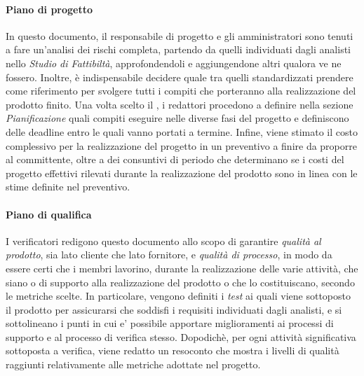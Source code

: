 		\paragraph{Piano di progetto}
			In questo documento, il responsabile di progetto e gli amministratori sono tenuti a fare un'analisi dei rischi completa, partendo da quelli individuati dagli analisti nello \textit{Studio di Fattibiltà}, approfondendoli e aggiungendone altri qualora ve ne fossero. Inoltre, è indispensabile decidere quale  tra quelli standardizzati prendere come riferimento per svolgere tutti i compiti che porteranno alla realizzazione del prodotto finito. Una volta scelto il , i redattori procedono a definire nella sezione \textit{Pianificazione} quali compiti eseguire nelle diverse fasi del progetto e definiscono delle deadline entro le quali vanno portati a termine. Infine, viene stimato il costo complessivo per la realizzazione del progetto in un preventivo a finire da proporre al committente, oltre a dei consuntivi di periodo che determinano se i costi del progetto effettivi rilevati durante la realizzazione del prodotto sono in linea con le stime definite nel preventivo.
		\paragraph{Piano di qualifica}
 			I verificatori redigono questo documento allo scopo di garantire \textit{qualità al prodotto}, sia lato cliente che lato fornitore, e \textit{qualità di processo}, in modo da essere certi che i membri lavorino, durante la realizzazione delle varie attività, che siano o di supporto alla realizzazione del prodotto o che lo costituiscano, secondo le metriche scelte. In particolare, vengono definiti i \textit{test} ai quali viene sottoposto il prodotto per assicurarsi che soddisfi i requisiti individuati dagli analisti, e si sottolineano i punti in cui e' possibile apportare miglioramenti ai processi di supporto e al processo di verifica stesso. Dopodichè, per ogni attività significativa sottoposta a verifica, viene redatto un resoconto che mostra i livelli di qualità raggiunti relativamente alle metriche adottate nel progetto.